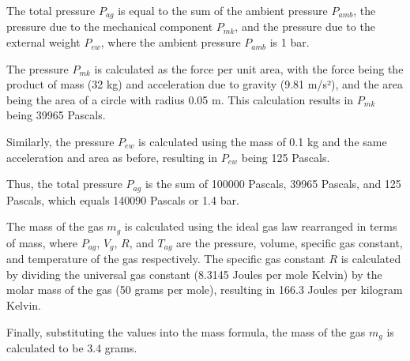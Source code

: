 The total pressure \( P_{ag} \) is equal to the sum of the ambient pressure \( P_{amb} \), the pressure due to the mechanical component \( P_{mk} \), and the pressure due to the external weight \( P_{ew} \), where the ambient pressure \( P_{amb} \) is 1 bar.

The pressure \( P_{mk} \) is calculated as the force per unit area, with the force being the product of mass (32 kg) and acceleration due to gravity (9.81 m/s²), and the area being the area of a circle with radius 0.05 m. This calculation results in \( P_{mk} \) being 39965 Pascals.

Similarly, the pressure \( P_{ew} \) is calculated using the mass of 0.1 kg and the same acceleration and area as before, resulting in \( P_{ew} \) being 125 Pascals.

Thus, the total pressure \( P_{ag} \) is the sum of 100000 Pascals, 39965 Pascals, and 125 Pascals, which equals 140090 Pascals or 1.4 bar.

The mass of the gas \( m_g \) is calculated using the ideal gas law rearranged in terms of mass, where \( P_{ag} \), \( V_g \), \( R \), and \( T_{ag} \) are the pressure, volume, specific gas constant, and temperature of the gas respectively. The specific gas constant \( R \) is calculated by dividing the universal gas constant (8.3145 Joules per mole Kelvin) by the molar mass of the gas (50 grams per mole), resulting in 166.3 Joules per kilogram Kelvin.

Finally, substituting the values into the mass formula, the mass of the gas \( m_g \) is calculated to be 3.4 grams.